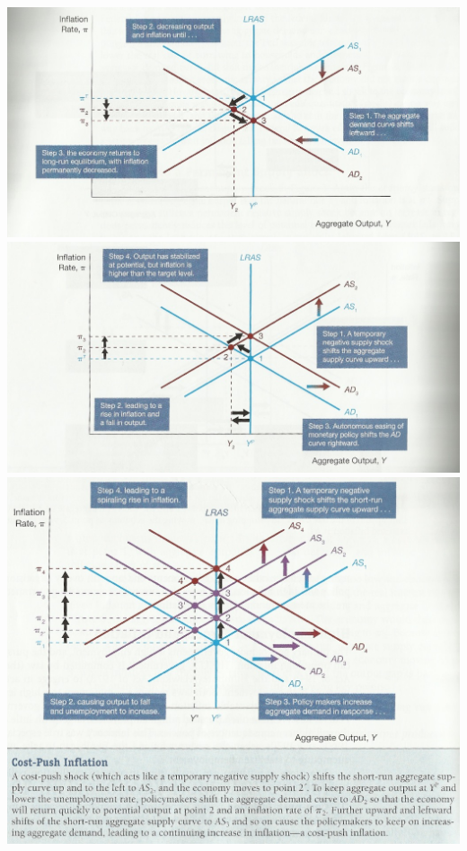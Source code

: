 \documentclass[12pt]{examnotes}
\begin{document}
\begin{center}
  \includegraphics[scale=0.5]{./imgs/c24f1.jpg}
  \includegraphics[scale=0.5]{./imgs/c24f7.jpg}
  \includegraphics[scale=0.4]{./imgs/c24f9.jpg}

\end{center}
\end{document}
